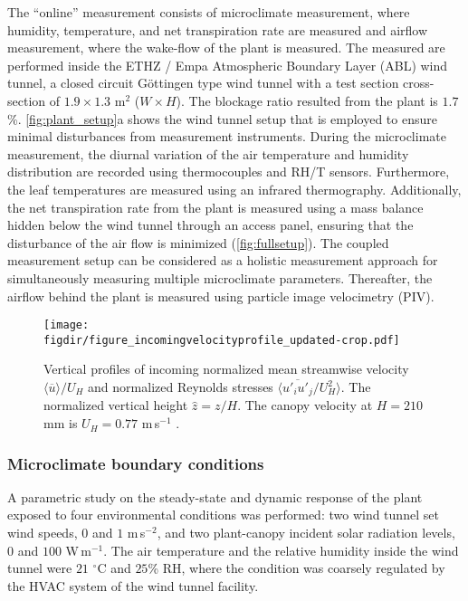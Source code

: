 The “online” measurement consists of microclimate measurement, where humidity, temperature, and net transpiration rate are measured and airflow measurement, where the wake-flow of the plant is measured. The measured are performed inside the ETHZ / Empa Atmospheric Boundary Layer (ABL) wind tunnel, a closed circuit Göttingen type wind tunnel with a test section cross-section of $1.9\times1.3$ m$^2$ ($W\times H$). The blockage ratio resulted from the plant is $1.7$\%. \cref{fig:plant_setup}a shows the wind tunnel setup that is employed to ensure minimal disturbances from measurement instruments. During the microclimate measurement, the diurnal variation of the air temperature and humidity distribution are recorded using thermocouples and RH/T sensors. Furthermore, the leaf temperatures are measured using an infrared thermography. Additionally, the net transpiration rate from the plant is measured using a mass balance hidden below the wind tunnel through an access panel, ensuring that the disturbance of the air flow is minimized  (\cref{fig:fullsetup}). The coupled measurement setup can be considered as a holistic measurement approach for simultaneously measuring multiple microclimate parameters. Thereafter, the airflow behind the plant is measured using particle image velocimetry (PIV).
	
	\begin{figure}[p]
		\centering
		\texttt{[image: \\figdir/figure\_incomingvelocityprofile\_updated-crop.pdf]}
		\caption{Vertical profiles of incoming  normalized mean streamwise velocity $\langle \overline{u} \rangle / U_H$ and  normalized Reynolds stresses $\langle \overline{u'_i u'_j}/U_H^2 \rangle$. The normalized vertical height  $\hat{z}=z/H$. The canopy velocity at $H=210$ mm is $U_H = 0.77$ m\,s$^{-1}$ \citep{Tsalicoglou2018}.}
		\label{fig:incomingvelocityprofile}
	\end{figure}


\subsubsection*{Microclimate boundary conditions}
A parametric study on the steady-state and dynamic response of the plant exposed to four environmental conditions was performed: two wind tunnel set wind speeds, $0$ and $1$ m\,s$^{-2}$, and two plant-canopy incident solar radiation levels, $0$ and $100$ W\,m$^{-1}$. The air temperature and the relative humidity inside the wind tunnel were $21$ $^{\circ}$C and $25$\% RH, where the condition was coarsely regulated by the HVAC system of the wind tunnel facility. 

